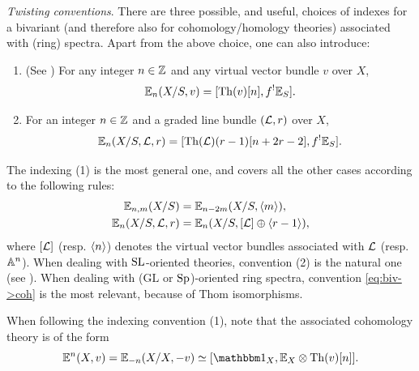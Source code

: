 \begin{rem} \emph{Twisting conventions}. There are three possible, and useful, choices of indexes for a bivariant (and therefore also for cohomology/homology theories)
associated with (ring) spectra. Apart from the above choice, one can also introduce:
\begin{enumerate}
\item (See \cite[]{DJK}) For any integer $n \in \ZZ$ and any virtual vector bundle $v$ over $X$,
$$
\E_{n}(X/S,v)=[\Th(v)[n],f^!\E_S].
$$
\item For an integer $n \in \ZZ$ and a graded line bundle $(\cL,r)$ over $X$,
$$
\E_{n}(X/S,\cL,r)=[\Th(\cL)(r-1)[n+2r-2],f^!\E_S].
$$
\end{enumerate}
The indexing (1) is the most general one, and covers all the other cases according to
the following rules:
\begin{align*}
\E_{n,m}(X/S)&=\E_{n-2m}(X/S,\tw m), \\
\E_{n}(X/S,\cL,r)&=\E_n(X/S,[\cL] \oplus \tw{r-1}),
\end{align*}
where $[\cL]$ (resp. $\tw n$) denotes the virtual vector bundles associated with $\cL$
(resp. $\AA^n$).
When dealing with $\SL$-oriented theories,
convention (2) is the natural one (see \cite[]{DFJK}).
When dealing with ($\mathrm{GL}$ or $\Sp$)-oriented ring spectra, convention \eqref{eq:biv->coh} is the most relevant,
because of Thom isomorphisms. 

When following the indexing convention (1), note that the associated cohomology theory is of the form
\[
\E^{n}(X,v)=\E_{-n}(X/X,-v)\simeq [\un_X,\E_X\otimes \Th(v)[n]].
\] 
\end{rem}

